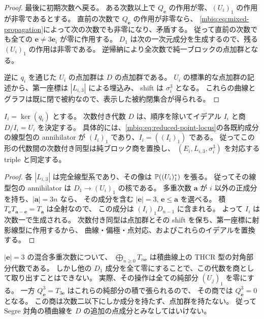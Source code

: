 \begin{proof}
最後に初期次数へ戻る。
ある次数以上で $Q_{\boldsymbol e}$ の作用が零、$(U_i)_1$ の作用が非零であるとする。
直前の次数で $Q_{\boldsymbol e}$ の作用が非零なら、
\eqref{mbiq:eq:mixed-propagation}によって次の次数でも非零になり、矛盾する。
従って直前の次数でも全ての $\boldsymbol e\ne3\boldsymbol e_i$ が零に作用する。
$D_1$ は次の一次元成分を生成するので、残る $(U_i)_1$ の作用は非零である。
逆帰納により全次数で純一ブロックの点加群となる。

逆に $q_i$ を通じた $U_i$ の点加群は $D$ の点加群である。
$U_i$ の標準的な点加群の記述から、第一座標は $|L_{i,3}|$ による埋込み、
shift は $\sigma_i^3$ となる。
これらの曲線とグラフは既に閉で被約なので、表示した被約閉集合が得られる。
\end{proof}

\begin{corollary}[純ブロック商の内在的認識]
\label{mbiq:cor:intrinsic-quotients}
$I_i=\ker(q_i)$ とする。
次数付き代数 $D$ は、順序を除いてイデアル $I_i$ と商 $D/I_i=U_i$ を決定する。
具体的には、\eqref{mbiq:eq:reduced-point-locus}の各既約成分の線型包の annihilator が
$(I_i)_1$ であり、$I_i=((I_i)_1)$ である。
従ってこの形の代数間の次数付き同型は純ブロック商を置換し、
$(E_i,L_{i,3},\sigma_i^3)$ を対応する triple と同定する。
\end{corollary}
\begin{proof}
各 $|L_{i,3}|$ は完全線型系であり、その像は $\mathbb P((U_i)_1^*)$ を張る。
従ってその線型包の annihilator は $D_1\to(U_i)_1$ の核である。
多重次数 $\boldsymbol a$ が $i$ 以外の正成分を持ち、$|\boldsymbol a|=3n$ なら、
その成分を含む $|\boldsymbol e|=3$, $\boldsymbol e\leq\boldsymbol a$ を選べる。
積 $T_{\boldsymbol e}T_{\boldsymbol a-\boldsymbol e}=T_{\boldsymbol a}$ は全射なので、
この成分は $(I_i)_1D_{n-1}$ に含まれる。
よって $I_i$ は次数一で生成される。
次数付き同型は点加群とその shift を保ち、第一座標に射影線型に作用するから、
曲線・偏極・点対応、およびこれらのイデアルを置換する。
\end{proof}

\begin{remark}
\label{mbiq:rem:segre}
$|\boldsymbol e|=3$ の混合多重次数について、
$\bigoplus_{n\geq0}T_{n\boldsymbol e}$ は積曲線上の THCR 型の対角部分代数である。
しかし他の $D_1$ 成分を全て零にすることで、この代数を商として取り出すことはできない。
実際、その操作は全ての純部分 $(U_j)_1$ を零にする。
一方 $Q_{\boldsymbol e}^3=T_{3\boldsymbol e}$ はこれらの純部分の積で張られるので、
その商では $Q_{\boldsymbol e}^3=0$ となる。
この商は次数二以下にしか成分を持たず、点加群を持たない。
従って Segre 対角の積曲線を $D$ の追加の点成分とみなしてはいけない。
\end{remark}

